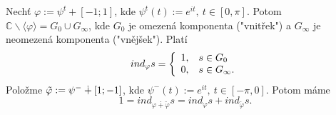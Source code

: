 \begin{example}
Nechť $\varphi:=\psi^t+[-1;1]$, kde $\psi^t(t):=e^{it},\ t\in[0,\pi]$. Potom $\mathbb{C}\backslash\langle{\varphi}\rangle=G_0\cup{G_\infty}$, kde $G_0$ je omezená komponenta ("vnitřek") a $G_\infty$ je neomezená komponenta ("vnějšek"). Platí
$${ind}_\varphi{s}=
\left\{
\begin{array}{ll}
1, \hspace{3mm} s\in{G_0}\\
0, \hspace{3mm} s\in{G_\infty}.
\end{array}
\right.$$
Položme $\Tilde{\varphi}:=\psi^-\dotplus[1;-1]$,
kde $\psi^-(t):=e^{it},\ t\in[-\pi,0]$. Potom máme 
$$1={ind}_{\varphi\dotplus\tilde\varphi}{s}={ind}_\varphi{s}+{ind}_{\tilde{\varphi}}{s}.$$
\end{example}

